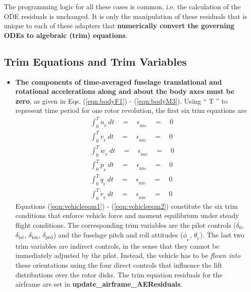 The programming logic for all these cases is common, i.e. the calculation of the ODE residuals is unchanged. It is only the manipulation of these residuals that is unique to each of these adapters that \textbf{numerically convert the governing ODEs to algebraic (trim) equations}. 
\subsection{\textbf{Trim Equations and Trim Variables}}
\begin{itemize}
\item \textbf{The components of time-averaged fuselage translational and rotational accelerations along and about the body axes must be zero}, as given in Eqs. (\ref{eqn:bodyF1}) - (\ref{eqn:bodyM3}). Using `` T '' to represent time period for one rotor revolution, the first six trim equations are
\begin{eqnarray}
\label{eqn:vehicleeqm1}
\int_0^{T} \dot{u}_{_\textrm{F }} dt \quad = \quad \epsilon_{_\textrm{RB1}} \quad = \quad 0 \\
\int_0^{T} \dot{v}_{_\textrm{F }} dt \quad = \quad \epsilon_{_\textrm{RB2}} \quad = \quad 0 \\
\int_0^{T} \dot{w}_{_\textrm{F }} dt \quad = \quad \epsilon_{_\textrm{RB3}} \quad = \quad 0 \\
\int_0^{T} \dot{p}_{_\textrm{F }} dt \quad = \quad \epsilon_{_\textrm{RB4}} \quad = \quad 0 \\
\int_0^{T} \dot{q}_{_\textrm{F }} dt \quad = \quad \epsilon_{_\textrm{RB5}} \quad = \quad 0 \\
\label{eqn:vehicleeqm2}
\int_0^{T} \dot{r}_{_\textrm{F }} dt \quad = \quad \epsilon_{_\textrm{RB6}} \quad = \quad 0 
\end{eqnarray}
Equations (\ref{eqn:vehicleeqm1}) - (\ref{eqn:vehicleeqm2}) constitute the six trim conditions that enforce vehicle force and moment equilibrium under steady flight conditions. The corresponding trim variables are the pilot controls ($\delta_0$, $\delta_\textrm{lat}$, $\delta_\textrm{lon}$, $\delta_\textrm{ped}$) and the fuselage pitch and roll attitudes ($\phi_{_\textrm{F}}$, $\theta_{_\textrm{F}}$). The last two trim variables are indirect controls, in the sense that they cannot be immediately adjusted by the pilot. Instead, the vehicle has to be \emph{flown into} these orientations using the four direct controls that influence the lift distributions over the rotor disks. The trim equation residuals for the airframe are set in \textbf{update\_airframe\_AEResiduals}.


\end{itemize}
